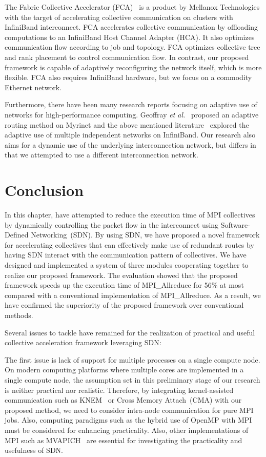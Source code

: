 The Fabric Collective Accelerator (FCA)~\autocite{fca} is a product by
Mellanox Technologies with the target of accelerating collective
communication on clusters with InfiniBand interconnect. FCA accelerates
collective communication by offloading computations to an InfiniBand
Host Channel Adapter (HCA). It also optimizes communication flow
according to job and topology. FCA optimizes collective tree and rank
placement to control communication flow. In contrast, our proposed
framework is capable of adaptively reconfiguring the network itself,
which is more flexible. FCA also requires InfiniBand hardware, but we
focus on a commodity Ethernet network.

Furthermore, there have been many research reports focusing on adaptive
use of networks for high-performance computing. Geoffray \emph{et
al.}~\autocite{Geoffray2008} proposed an adaptive routing method on Myrinet
and the above mentioned literature~\autocite{Jiuxing2004} explored the
adaptive use of multiple independent networks on InfiniBand. Our research also
aims for a dynamic use of the underlying interconnection network, but differs
in that we attempted to use a different interconnection network.

\section{Conclusion}\label{sec:iii-conclusion}

In this chapter, have attempted to reduce the execution time of MPI
collectives by dynamically controlling the packet flow in the interconnect
using Software-Defined Networking~(SDN).
By using SDN, we have proposed a novel framework for accelerating collectives
that can effectively make use of redundant routes by having SDN interact
with the communication pattern of collectives. We have designed and
implemented a system of three modules cooperating together to realize
our proposed framework. The evaluation showed that the proposed framework
speeds up the execution time of MPI\_Allreduce for 56\% at most compared with
a conventional implementation of MPI\_Allreduce. As a result, we have
confirmed the superiority of the proposed framework over conventional methods.

Several issues to tackle have remained for the realization of practical
and useful collective acceleration framework leveraging SDN\@:

The first issue is lack of support for multiple processes on a single compute
node. On modern computing platforms where multiple cores are implemented in a
single compute node, the assumption set in this preliminary stage of our
research is neither practical nor realistic. Therefore, by integrating
kernel-assisted communication such as KNEM~\autocite{Goglin2013} or Cross
Memory Attach~(CMA) with our proposed method, we need to consider intra-node
communication for pure MPI jobs. Also, computing paradigms such as the hybrid
use of OpenMP with MPI must be considered for enhancing practicality. Also,
other implementations of MPI such as MVAPICH~\autocite{mvapich} are essential
for investigating the practicality and usefulness of SDN\@.

